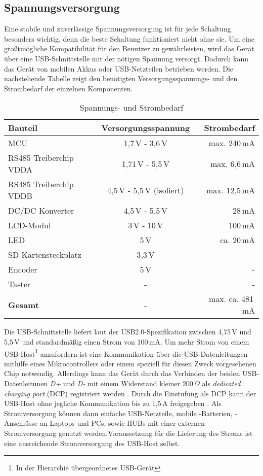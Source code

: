 
\subsection{Spannungsversorgung}
Eine stabile und zuverlässige Spannungsversorgung ist für jede Schaltung besonders wichtig, denn die beste Schaltung funktioniert nicht ohne sie. Um eine großtmögliche Kompatibilität für den Benutzer zu gewährleisten, wird das Gerät über eine USB-Schnittstelle mit der nötigen Spannung versorgt. Dadurch kann das Gerät von mobilen Akkus oder USB-Netzteilen betrieben werden. Die nachstehende Tabelle zeigt den benötigten Versorgungsspannungs- und den Strombedarf der einzelnen Komponenten. 
\begin{table}[h]
	\begin{center}
		\begin{tabular}{l | c | r }
			\textbf{Bauteil} & \textbf{Versorgungsspannung} & \textbf{Strombedarf}\\
			\hline
			MCU & 1,7\,V - 3,6\,V & max. 240\,mA\\
			RS485 Treiberchip VDDA & 1,71\,V - 5,5\,V & max. 6,6\,mA\\
			RS485 Treiberchip VDDB & 4,5\,V - 5,5\,V (isoliert)& max. 12,5\,mA\\
			DC/DC Konverter & 4,5\,V - 5,5\,V & 28\,mA\\
			LCD-Modul & 3\,V - 10\,V & 100\,mA\\
			LED & 5\,V & ca. 20\,mA\\
			SD-Kartensteckplatz & 3,3\,V & -\\
			Encoder & 5\,V & -\\
			Taster & - & -\\
			\hline
			\textbf{Gesamt} & - & max. ca. 481\,mA
		\end{tabular}
	\caption{Spannungs- und Strombedarf}
	\label{tab:VDD+IDD}
	\end{center}
\end{table}
Die USB-Schnittstelle liefert laut der USB2.0-Spezifikation zwischen 4,75\,V und 5,5\,V \cite[s. 283]{USB-PD} und standardmäßig einen Strom von 100\,mA. Um mehr Strom von einem USB-Host\footnote{In der Hierarchie übergeordnetes USB-Gerät} anzufordern ist eine Kommunikation über die USB-Datenleitungen mithilfe eines Mikrocontrollers oder einem speziell für diesen Zweck vorgesehenen Chip notwendig. Allerdings kann das Gerät durch das Verbinden der beiden USB-Datenleitunen \textit{D+} und \textit{D-} mit einem Widerstand kleiner 200\,$\Omega$ als \textit{dedicated charging port} (DCP) registriert werden \cite[s. 41]{USB-Battery}. Durch die Einstufung als DCP kann der USB-Host ohne jegliche Kommunikation bis zu 1,5\,A freigegeben \cite[s. 45]{USB-Battery}. Als Stromversorgung können dann einfache USB-Netzteile, mobile -Batterien, -Anschlüsse an Laptops und PCs, sowie HUBs mit einer externen Stromversorgung genutzt werden.Voraussetzung für die Lieferung des Stroms ist eine ausreichende Stromversorgung des USB-Host selbst. 
